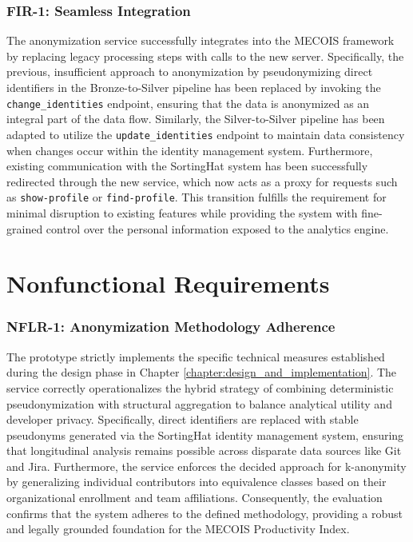 \subsubsection{FIR-1: Seamless Integration}

The anonymization service successfully integrates into the MECOIS framework by replacing legacy processing steps with calls to the new server. Specifically, the previous, insufficient approach to anonymization by pseudonymizing direct identifiers in the Bronze-to-Silver pipeline has been replaced by invoking the \texttt{change\_identities} endpoint, ensuring that the data is anonymized as an integral part of the data flow. Similarly, the Silver-to-Silver pipeline has been adapted to utilize the \texttt{update\_identities} endpoint to maintain data consistency when changes occur within the identity management system. Furthermore, existing communication with the SortingHat system has been successfully redirected through the new service, which now acts as a proxy for requests such as \texttt{show-profile} or \texttt{find-profile}. This transition fulfills the requirement for minimal disruption to existing features while providing the system with fine-grained control over the personal information exposed to the analytics engine.

\section{Nonfunctional Requirements}

\subsubsection{NFLR-1: Anonymization Methodology Adherence}

The prototype strictly implements the specific technical measures established during the design phase in Chapter \ref{chapter:design_and_implementation}. The service correctly operationalizes the hybrid strategy of combining deterministic pseudonymization with structural aggregation to balance analytical utility and developer privacy. Specifically, direct identifiers are replaced with stable pseudonyms generated via the SortingHat identity management system, ensuring that longitudinal analysis remains possible across disparate data sources like Git and Jira. Furthermore, the service enforces the decided approach for k-anonymity by generalizing individual contributors into equivalence classes based on their organizational enrollment and team affiliations. Consequently, the evaluation confirms that the system adheres to the defined methodology, providing a robust and legally grounded foundation for the MECOIS Productivity Index.

